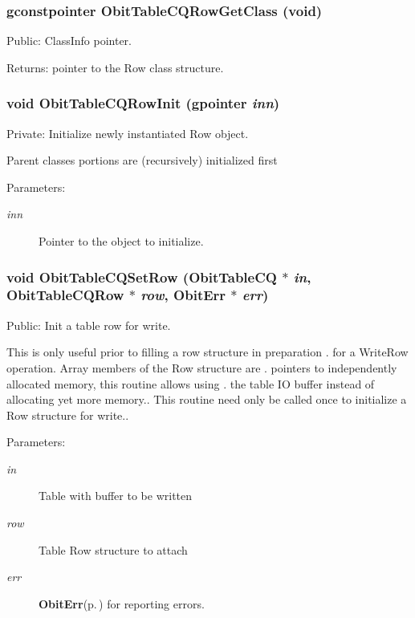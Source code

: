 \subsubsection{\setlength{\rightskip}{0pt plus 5cm}gconstpointer Obit\-Table\-CQRow\-Get\-Class (void)}\label{ObitTableCQ_8c_a15}


Public: Class\-Info pointer. 

\begin{Desc}
\item[Returns:]pointer to the Row class structure. \end{Desc}
\subsubsection{\setlength{\rightskip}{0pt plus 5cm}void Obit\-Table\-CQRow\-Init (gpointer {\em inn})}\label{ObitTableCQ_8c_a6}


Private: Initialize newly instantiated Row object. 

Parent classes portions are (recursively) initialized first \begin{Desc}
\item[Parameters:]
\begin{description}
\item[{\em inn}]Pointer to the object to initialize. \end{description}
\end{Desc}
\subsubsection{\setlength{\rightskip}{0pt plus 5cm}void Obit\-Table\-CQSet\-Row ({\bf Obit\-Table\-CQ} $\ast$ {\em in}, {\bf Obit\-Table\-CQRow} $\ast$ {\em row}, {\bf Obit\-Err} $\ast$ {\em err})}\label{ObitTableCQ_8c_a23}


Public: Init a table row for write. 

This is only useful prior to filling a row structure in preparation . for a Write\-Row operation. Array members of the Row structure are . pointers to independently allocated memory, this routine allows using . the table IO buffer instead of allocating yet more memory.. This routine need only be called once to initialize a Row structure for write.. \begin{Desc}
\item[Parameters:]
\begin{description}
\item[{\em in}]Table with buffer to be written \item[{\em row}]Table Row structure to attach \item[{\em err}]{\bf Obit\-Err}{\rm (p.\,\pageref{structObitErr})} for reporting errors. \end{description}
\end{Desc}
